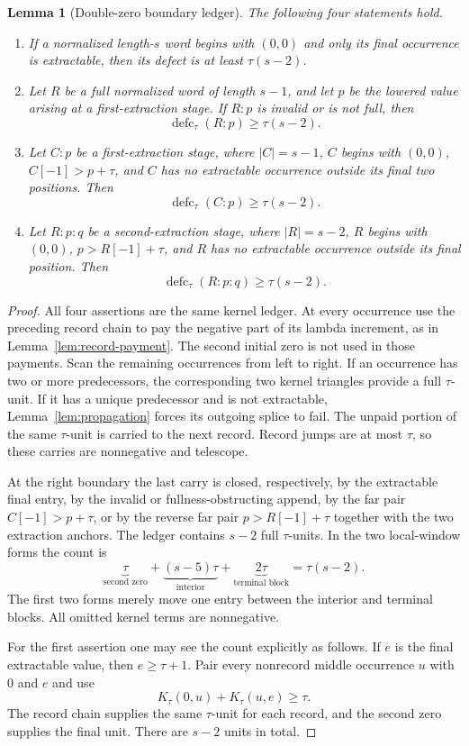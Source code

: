 \documentclass[11pt]{article}
\newtheorem{lemma}[theorem]{Lemma}
\theoremstyle{definition}
\theoremstyle{remark}
\newcommand{\defc}{\operatorname{defc}}
\begin{document}
\begin{lemma}[Double-zero boundary ledger]
\label{lem:boundary-ledger}
The following four statements hold.
\begin{enumerate}
\item If a normalized length-$s$ word begins with $(0,0)$ and only its final
occurrence is extractable, then its defect is at least $\tau(s-2)$.
\item Let $R$ be a full normalized word of length $s-1$, and let $p$ be the
lowered value arising at a first-extraction stage.  If $R:p$ is invalid or is
not full, then
\[
  \defc_\tau(R:p)\ge\tau(s-2).
\]
\item Let $C:p$ be a first-extraction stage, where $|C|=s-1$, $C$ begins
with $(0,0)$, $C[-1]>p+\tau$, and $C$ has no extractable occurrence outside
its final two positions.  Then
\[
  \defc_\tau(C:p)\ge\tau(s-2).
\]
\item Let $R:p:q$ be a second-extraction stage, where $|R|=s-2$, $R$ begins
with $(0,0)$, $p>R[-1]+\tau$, and $R$ has no extractable occurrence outside
its final position.  Then
\[
  \defc_\tau(R:p:q)\ge\tau(s-2).
\]
\end{enumerate}
\end{lemma}

\begin{proof}
All four assertions are the same kernel ledger.  At every occurrence use the
preceding record chain to pay the negative part of its lambda increment, as
in Lemma~\ref{lem:record-payment}.  The second initial zero is not used in
those payments.  Scan the remaining occurrences from left to right.  If an
occurrence has two or more predecessors, the corresponding two kernel
triangles provide a full $\tau$-unit.  If it has a unique predecessor and is
not extractable, Lemma~\ref{lem:propagation} forces its outgoing splice to
fail.  The unpaid portion of the same $\tau$-unit is carried to the next
record.  Record jumps are at most $\tau$, so these carries are nonnegative
and telescope.

At the right boundary the last carry is closed, respectively, by the
extractable final entry, by the invalid or fullness-obstructing append, by
the far pair $C[-1]>p+\tau$, or by the reverse far pair
$p>R[-1]+\tau$ together with the two extraction anchors.  The ledger contains
$s-2$ full $\tau$-units.  In the two local-window forms the count is
\[
  \underbrace{\tau}_{\text{second zero}}
  +\underbrace{(s-5)\tau}_{\text{interior}}
  +\underbrace{2\tau}_{\text{terminal block}}
  =\tau(s-2).
\]
The first two forms merely move one entry between the interior and terminal
blocks.  All omitted kernel terms are nonnegative.

For the first assertion one may see the count explicitly as follows.  If
$e$ is the final extractable value, then $e\ge\tau+1$.  Pair every nonrecord
middle occurrence $u$ with $0$ and $e$ and use
\[
  K_\tau(0,u)+K_\tau(u,e)\ge\tau.
\]
The record chain supplies the same $\tau$-unit for each record, and the
second zero supplies the final unit.  There are $s-2$ units in total.
\end{proof}
\end{document}

